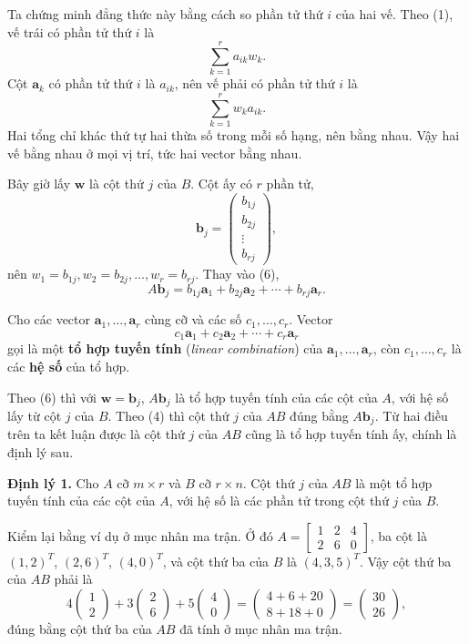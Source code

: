 \documentclass[12pt,a4paper]{article}
\begin{document}
Ta chứng minh đẳng thức này bằng cách so phần tử thứ \(i\) của hai vế. Theo (1), vế trái có phần tử thứ \(i\) là
$$
\sum_{k=1}^{r}a_{ik}w_k.
$$
Cột \(\mathbf{a}_k\) có phần tử thứ \(i\) là \(a_{ik}\), nên vế phải có phần tử thứ \(i\) là
$$
\sum_{k=1}^{r}w_k a_{ik}.
$$
Hai tổng chỉ khác thứ tự hai thừa số trong mỗi số hạng, nên bằng nhau. Vậy hai vế bằng nhau ở mọi vị trí, tức hai vector bằng nhau.

Bây giờ lấy \(\mathbf{w}\) là cột thứ \(j\) của \(B\). Cột ấy có \(r\) phần tử,
$$
\mathbf{b}_j=
\left( \begin{array}{c} b_{1j}\\ b_{2j}\\ \vdots\\ b_{rj} \end{array} \right),
$$
nên \(w_1=b_{1j},w_2=b_{2j},\ldots,w_r=b_{rj}\). Thay vào (6),
$$
A\mathbf{b}_j=b_{1j}\mathbf{a}_1+b_{2j}\mathbf{a}_2+\cdots+b_{rj}\mathbf{a}_r.
$$

Cho các vector \(\mathbf{a}_1,\ldots,\mathbf{a}_r\) cùng cỡ và các số \(c_1,\ldots,c_r\). Vector
$$
c_1\mathbf{a}_1+c_2\mathbf{a}_2+\cdots+c_r\mathbf{a}_r
$$
gọi là một \textbf{tổ hợp tuyến tính} (\emph{linear combination}) của \(\mathbf{a}_1,\ldots,\mathbf{a}_r\), còn \(c_1,\ldots,c_r\) là các \textbf{hệ số} của tổ hợp. 

Theo (6) thì với \(\mathbf{w}=\mathbf{b}_j\), \(A\mathbf{b}_j\) là tổ hợp tuyến tính của các cột của \(A\), với hệ số lấy từ cột \(j\) của \(B\). Theo (4) thì cột thứ \(j\) của \(AB\) đúng bằng \(A\mathbf{b}_j\). Từ hai điều trên ta kết luận được là cột thứ \(j\) của \(AB\) cũng là tổ hợp tuyến tính ấy, chính là định lý sau.

\textbf{Định lý 1.} Cho \(A\) cỡ \(m\times r\) và \(B\) cỡ \(r\times n\). Cột thứ \(j\) của \(AB\) là một tổ hợp tuyến tính của các cột của \(A\), với hệ số là các phần tử trong cột thứ \(j\) của \(B\).

Kiểm lại bằng ví dụ ở mục nhân ma trận. Ở đó \(A=\left[ \begin{array}{rrr} 1 & 2 & 4\\ 2 & 6 & 0 \end{array} \right]\), ba cột là \((1,2)^T\), \((2,6)^T\), \((4,0)^T\), và cột thứ ba của \(B\) là \((4,3,5)^T\). Vậy cột thứ ba của \(AB\) phải là
$$
4\left(\begin{array}{r}1\\2\end{array}\right)
+3\left(\begin{array}{r}2\\6\end{array}\right)
+5\left(\begin{array}{r}4\\0\end{array}\right)
=\left(\begin{array}{r}4+6+20\\8+18+0\end{array}\right)
=\left(\begin{array}{r}30\\26\end{array}\right),
$$
đúng bằng cột thứ ba của \(AB\) đã tính ở mục nhân ma trận.
\end{document}
